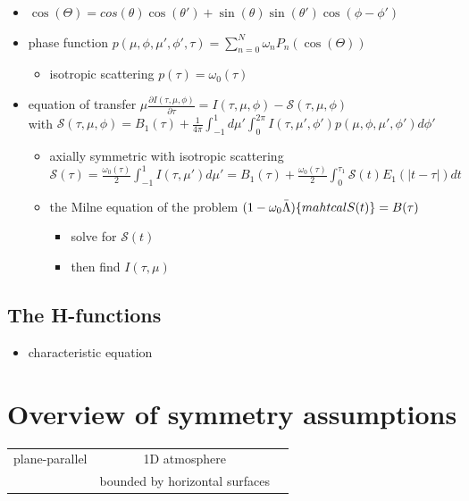 \documentclass[10pt,a4paper]{article}
\begin{document}
\begin{itemize}

\item $\cos(\Theta) = cos(\theta)\cos(\theta') + \sin(\theta)\sin(\theta') \cos(\phi-\phi')$

\item phase function $\boxed{p(\mu,\phi,\mu',\phi',\tau) = \sum_{n=0}^N \omega_n P_n(\cos(\Theta))}$
\begin{itemize}

\item isotropic scattering $p(\tau) = \omega_0(\tau)$
\end{itemize}

\item equation of transfer $\boxed{\mu \frac{\partial I(\tau,\mu,\phi)}{\partial \tau} = I(\tau,\mu,\phi) - \mathcal{S}(\tau,\mu,\phi)}$ 
\\ with $\mathcal{S}(\tau,\mu,\phi) = B_1(\tau) + \frac{1}{4 \pi} \int_{-1}^{1} d\mu' \int_0^{2\pi} I(\tau,\mu',\phi') p(\mu,\phi,\mu',\phi') d\phi'$
\begin{itemize}
\item axially symmetric with isotropic scattering \\
$\mathcal{S}(\tau) = \frac{\omega_0(\tau)}{2} \int_{-1}^{1} I(\tau,\mu') d\mu' = 
B_1(\tau) + \frac{\omega_0(\tau)}{2} \int_0^{\tau_1} \mathcal{S} (t) E_1(|t-\tau|)dt $
\item the Milne equation of the problem $(1-\omega_0 \bar{\Lambda})\{ \\mahtcal{S}(t)\} = B(\tau)$
\begin{itemize}
\item solve for $\mathcal{S}(t)$
\item then find $I(\tau,\mu)$
\end{itemize}

\end{itemize}
\end{itemize}

\subsection{The H-functions}
\begin{itemize}
\item characteristic equation
\end{itemize}



\newpage
\section{Overview of symmetry assumptions}
\begin{center}
\centering
{\tabulinesep=1.5mm
\begin{tabu}{|c|c|c|}
\hline 
plane-parallel & 1D atmosphere & \\ 
& bounded by horizontal surfaces & \\ \hline

\end{tabu}}
\end{center}
\end{document}
